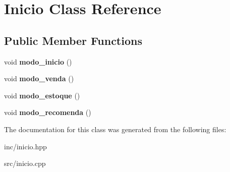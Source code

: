 \hypertarget{class_inicio}{}\section{Inicio Class Reference}
\label{class_inicio}
\subsection*{Public Member Functions}
\begin{DoxyCompactItemize}
\item 
\mbox{\label{class_inicio_a1b19189e2b26727c835afa465be7a4d2}} 
void {\bfseries modo\+\_\+inicio} ()
\item 
\mbox{\label{class_inicio_aefd6c9cea6dd76c9c3953c854ad47483}} 
void {\bfseries modo\+\_\+venda} ()
\item 
\mbox{\label{class_inicio_a6c81a17a924bbcf3b2dec6251530149d}} 
void {\bfseries modo\+\_\+estoque} ()
\item 
\mbox{\label{class_inicio_a23f98e4d158e53d0807cd747b0944d52}} 
void {\bfseries modo\+\_\+recomenda} ()
\end{DoxyCompactItemize}


The documentation for this class was generated from the following files\+:\begin{DoxyCompactItemize}
\item 
inc/inicio.\+hpp\item 
src/inicio.\+cpp\end{DoxyCompactItemize}
